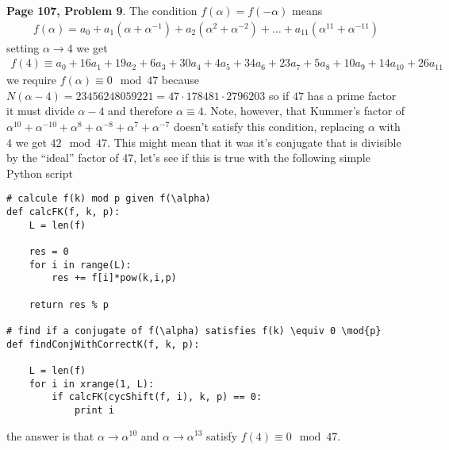 \documentclass[aps,preprint,preprintnumbers,nofootinbib,showpacs,prd]{revtex4-1}
\newcommand{\nbea}{\begin{eqnarray*}}
\newcommand{\neea}{\end{eqnarray*}}
\begin{document}
{\bf Page 107, Problem 9}. The condition $f(\alpha) = f(-\alpha)$ means
%
\nbea
f(\alpha) = a_0 + a_1(\alpha + \alpha^{-1}) + a_2(\alpha^2 + \alpha^{-2}) + \dots + a_{11}(\alpha^{11} + \alpha^{-11})
\neea
%
setting $\alpha \to 4$ we get
%
\nbea
f(4) \equiv a_0 + 16 a_1 + 19 a_2 + 6a_{3} + 30a_{4} + 4a_{5} + 34a_{6} + 23a_{7} + 5a_{8} + 10a_{9} + 14a_{10} + 26a_{11}
\neea
%
we require $f(\alpha) \equiv 0 \mod{47}$ because $N(\alpha - 4) = 23456248059221 = 47 \cdot 178481 \cdot 2796203$ so if $47$ has a prime factor it must divide $\alpha - 4$ and therefore $\alpha \equiv 4$. Note, however, that Kummer's factor of $\alpha^{10} + \alpha^{-10} + \alpha^{8} + \alpha^{-8} + \alpha^{7} + \alpha^{-7}$ doesn't satisfy this condition, replacing $\alpha$ with $4$ we get $42 \mod{47}$. This might mean that it was it's conjugate that is divisible by the ``ideal'' factor of 47, let's see if this is true with the following simple Python script
%
\begin{Verbatim}[baselinestretch=0.75]
# calcule f(k) mod p given f(\alpha)
def calcFK(f, k, p):
    L = len(f)

    res = 0
    for i in range(L):
        res += f[i]*pow(k,i,p)

    return res % p

# find if a conjugate of f(\alpha) satisfies f(k) \equiv 0 \mod{p}
def findConjWithCorrectK(f, k, p):

    L = len(f)
    for i in xrange(1, L):
        if calcFK(cycShift(f, i), k, p) == 0:
            print i
\end{Verbatim}
%
the answer is that $\alpha \to \alpha^{10}$ and $\alpha \to \alpha^{13}$ satisfy $f(4) \equiv 0 \mod{47}$.
\end{document}
